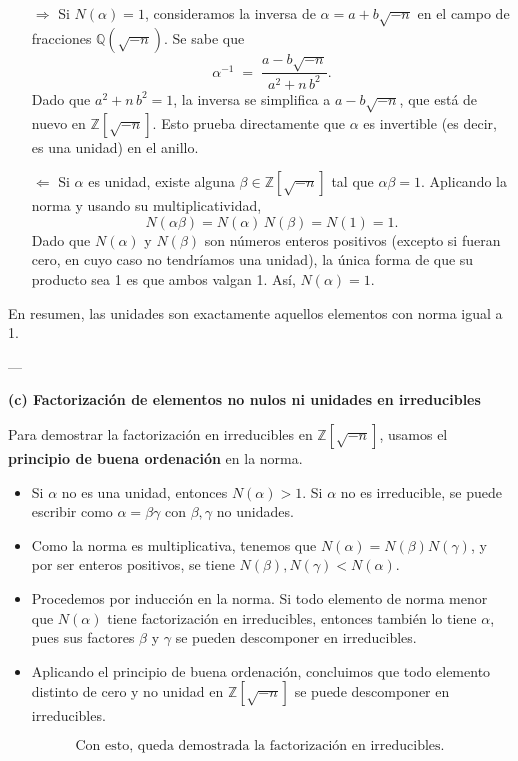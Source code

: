 \begin{itemize}
    \item[\(\Longrightarrow\)] Si $N(\alpha) = 1$, consideramos la inversa de $\alpha = a + b\sqrt{-n}$ en el campo de fracciones $\mathbb{Q}(\sqrt{-n})$. Se sabe que
    \[
    \alpha^{-1} \;=\; \frac{a - b\sqrt{-n}}{a^2 + n\,b^2}.
    \]
    Dado que $a^2 + n\,b^2 = 1$, la inversa se simplifica a $a - b\sqrt{-n}$, que está de nuevo en $\mathbb{Z}[\sqrt{-n}]$. Esto prueba directamente que $\alpha$ es invertible (es decir, es una unidad) en el anillo.
    
    \item[\(\Longleftarrow\)] Si $\alpha$ es unidad, existe alguna $\beta \in \mathbb{Z}[\sqrt{-n}]$ tal que $\alpha\beta = 1$. Aplicando la norma y usando su multiplicatividad,
    \[
    N(\alpha \beta) = N(\alpha)\,N(\beta) = N(1) = 1.
    \]
    Dado que $N(\alpha)$ y $N(\beta)$ son números enteros positivos (excepto si fueran cero, en cuyo caso no tendríamos una unidad), la única forma de que su producto sea 1 es que ambos valgan 1. Así, $N(\alpha)=1$.
\end{itemize}

En resumen, las unidades son exactamente aquellos elementos con norma igual a 1.

---

\noindent
\textbf{(c) Factorización de elementos no nulos ni unidades en irreducibles}

Para demostrar la factorización en irreducibles en $\mathbb{Z}[\sqrt{-n}]$, usamos el \textbf{principio de buena ordenación} en la norma.

\begin{itemize}
    \item Si $\alpha$ no es una unidad, entonces $N(\alpha) > 1$. Si $\alpha$ no es irreducible, se puede escribir como $\alpha = \beta \gamma$ con $\beta, \gamma$ no unidades.
    \item Como la norma es multiplicativa, tenemos que $N(\alpha) = N(\beta) N(\gamma)$, y por ser enteros positivos, se tiene $N(\beta), N(\gamma) < N(\alpha)$.
    \item Procedemos por inducción en la norma. Si todo elemento de norma menor que $N(\alpha)$ tiene factorización en irreducibles, entonces también lo tiene $\alpha$, pues sus factores $\beta$ y $\gamma$ se pueden descomponer en irreducibles.
    \item Aplicando el principio de buena ordenación, concluimos que todo elemento distinto de cero y no unidad en $\mathbb{Z}[\sqrt{-n}]$ se puede descomponer en irreducibles.
\end{itemize}

\[
\boxed{\text{Con esto, queda demostrada la factorización en irreducibles.}}
\]



